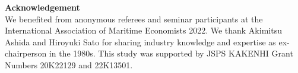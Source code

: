 \documentclass[11pt]{article}
\begin{document}
\textbf{Acknowledgement} \\
We benefited from anonymous referees and seminar participants at the International Association of Maritime Economists 2022. We thank Akimitsu Ashida and Hiroyuki Sato for sharing industry knowledge and expertise as ex-chairperson in the 1980s. This study was supported by JSPS KAKENHI Grant Numbers 20K22129 and 22K13501. 





\appendix

% 
% 
\end{document}
